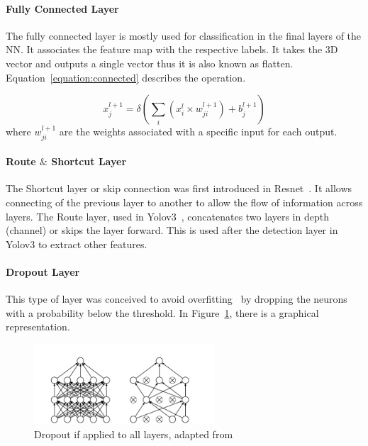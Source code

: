 \paragraph{Fully Connected Layer}

The fully connected layer is mostly used for classification in the final layers
of the NN. It associates the feature map with the respective labels.  It takes the
3D vector and outputs a single vector thus it is also known as flatten.
Equation~\ref{equation:connected} describes the operation.

\begin{equation} \label{equation:connected}
     \displaystyle x_{j}^{l+1}=\delta (\sum_{i}(x_{i}^{l} \times w_{ji}^{l+1})+ b_{j}^{l+1})
\end{equation}
where $w_{ji}^{l+1}$ are the weights associated with a specific input for each output.


\paragraph{Route $\&$ Shortcut Layer}

The Shortcut layer or skip connection was first introduced in
Resnet~\cite{resnet}.  It allows connecting of the previous layer to another to
allow the flow of information across layers.  The Route layer, used in
Yolov3~\cite{yolov3}, concatenates two layers in depth (channel) or skips the
layer forward. This is used after the detection layer in Yolov3 to extract other
features.

\paragraph{Dropout Layer}

This type of layer was conceived to avoid overfitting~\cite{Dropout} by dropping
the neurons with a probability below the threshold. In
Figure~\ref{figure:Dropout}, there is a graphical representation.
\begin{figure}[!htbp]
    \centering
    \includegraphics[width=0.6\textwidth]{Figures/dropout.png}
    \caption{Dropout if applied to all layers, adapted from~\cite{Dropout}}
    \label{figure:Dropout}
\end{figure} 


